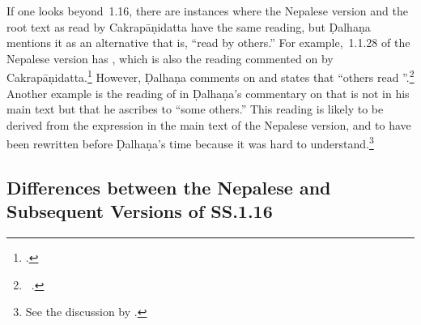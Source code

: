 If one looks beyond \SS\,1.16, there are instances where the Nepalese version and
the root text as read by Cakrapāṇidatta have the same reading, but Ḍalhaṇa
mentions it as an alternative that is, “read by others.” For example, \SS\,1.1.28 of
the Nepalese version has , which is also the reading
commented on by Cakrapāṇidatta.\footcite[17]{acar-1939} However, Ḍalhaṇa comments
on  and states that “others read ”.\footnote{\SS\ .} %
Another example is the reading of  in Ḍalhaṇa's commentary
on  that is not in his main text but that he ascribes to “some
others.” This reading is likely to be derived  from the expression
 in the main text of the Nepalese version, and to have been 
rewritten before Ḍalhaṇa's time because it was hard to understand.\footnote{See
the discussion by \citet[4--5]{birc-2021a}.}


\subsection{Differences between the Nepalese and Subsequent Versions of SS.1.16}


